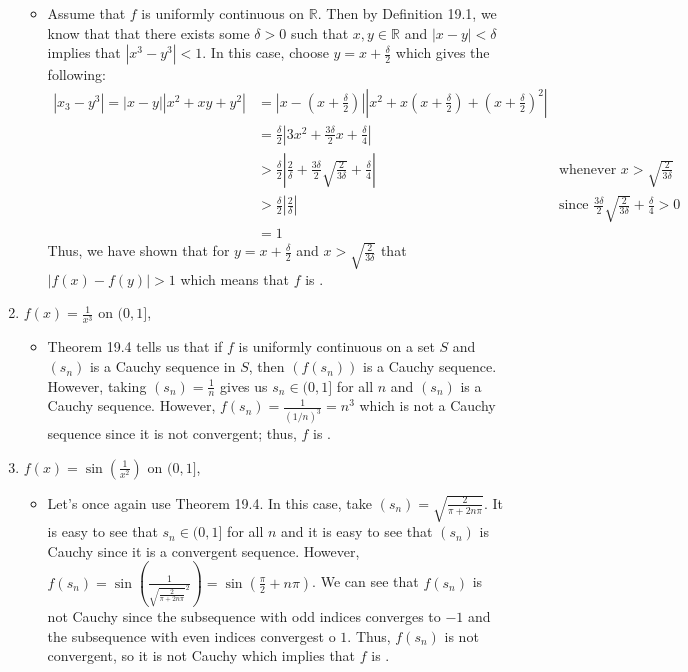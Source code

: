\documentclass[10pt,a4paper]{article}
\theoremstyle{definition}
\begin{document}
\begin{enumerate}[label = (\alph*)]
\begin{itemize}
	\item Assume that $f$ is uniformly continuous on $\mathbb{R}$. Then by Definition 19.1, we know that that there exists some $\delta > 0$ such that $x, y \in \mathbb{R}$ and $|x - y| < \delta$ implies that $|x^3 - y^3| < 1$. In this case, choose $y = x + \frac{\delta}{2}$ which gives the following:
	\begin{align*}
	|x_3 - y^3| = |x - y||x^2 + xy + y^2| &= \left|x - \left(x + \frac{\delta}{2}\right)\right|\left|x^2 + x\left(x + \frac{\delta}{2}\right) + \left(x + \frac{\delta}{2}\right)^2\right|\\
	&= \frac{\delta}{2}\left|3x^2 + \frac{3\delta}{2}x + \frac{\delta}{4}\right|\\
	&> \frac{\delta}{2}\left|\frac{2}{\delta} + \frac{3\delta}{2}\sqrt{\frac{2}{3\delta}} + \frac{\delta}{4}\right| &\text{whenever $x > \sqrt{\frac{2}{3\delta}}$}\\
	&> \frac{\delta}{2}\left|\frac{2}{\delta}\right| &\text{since $\frac{3\delta}{2}\sqrt{\frac{2}{3\delta}} + \frac{\delta}{4} > 0$}\\
	&= 1
	\end{align*}
	Thus, we have shown that for $y = x + \frac{\delta}{2}$ and $x > \sqrt{\frac{2}{3\delta}}$ that $|f(x) - f(y)| > 1$ which means that $f$ is .
	\end{itemize}
\item $f(x) = \frac{1}{x^3}$ on $(0,1]$,
	\begin{itemize}
	\item Theorem 19.4 tells us that if $f$ is uniformly continuous on a set $S$ and $(s_n)$ is a Cauchy sequence in $S$, then $(f(s_n))$ is a Cauchy sequence. However, taking $(s_n) = \frac{1}{n}$ gives us $s_n \in (0,1]$ for all $n$ and $(s_n)$ is a Cauchy sequence. However, $f(s_n) = \frac{1}{(1/n)^3} = n^3$ which is not a Cauchy sequence since it is not convergent; thus, $f$ is .
	\end{itemize}
\item $f(x)= \sin\left(\frac{1}{x^2}\right)$ on $(0,1]$,
	\begin{itemize}
	\item Let's once again use Theorem 19.4. In this case, take $(s_n) = \sqrt{\frac{2}{\pi + 2n\pi}}$. It is easy to see that $s_n \in (0,1]$ for all $n$ and it is easy to see that $(s_n)$ is Cauchy since it is a convergent sequence. However, $f(s_n) = \sin\left(\frac{1}{\sqrt{\frac{2}{\pi + 2n\pi}}^2}\right) = \sin\left(\frac{\pi}{2} + n\pi\right)$. We can see that $f(s_n)$ is not Cauchy since the subsequence with odd indices converges to $-1$ and the subsequence with even indices convergest o $1$. Thus, $f(s_n)$ is not convergent, so it is not Cauchy which implies that $f$ is .

\end{itemize}
\end{enumerate}
\end{document}
